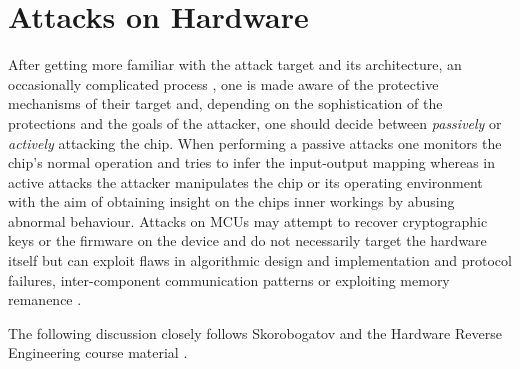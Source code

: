 \section{Attacks on Hardware}
\label{sec:curr_attacks}
After getting more familiar with the attack target and its architecture, an occasionally complicated process \citep{sergei:thesis} \citep{hwre}, one is made aware of the protective mechanisms of their target and, depending on the sophistication of the protections and the goals of the attacker, one should decide between \emph{passively} or \emph{actively} attacking the chip. When performing a passive attacks one monitors the chip's normal operation and tries to infer the input-output mapping whereas in active attacks the attacker manipulates the chip or its operating environment with the aim of obtaining insight on the chips inner workings by abusing abnormal behaviour. Attacks on MCUs may attempt to recover cryptographic keys or the firmware on the device and do not necessarily target the hardware itself but can exploit flaws in algorithmic design and implementation and protocol failures, inter-component communication patterns \citep{anderson:cautionary_note} \citep{kocher:DPA} or exploiting memory remanence \citep{sergei:thesis} \citep{gutman:memory_remanence}.

The following discussion closely follows Skorobogatov \citep{sergei:thesis} and the Hardware Reverse Engineering course material \citep{hwre}.

